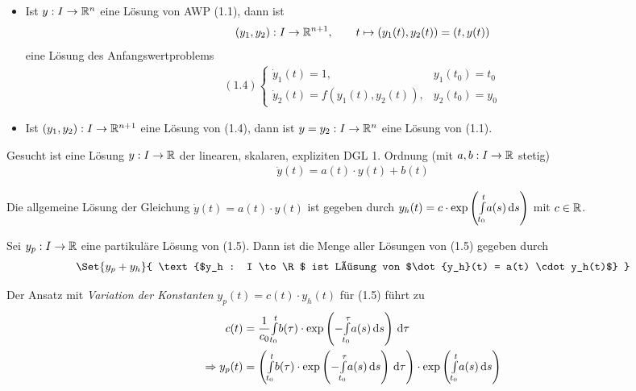 \documentclass{cheat-sheet}
\begin{document}
\begin{satz}
  \begin{itemize}
    \item Ist $y : I \to \mathbb{R}^n$ eine Lösung von AWP (1.1), dann ist
    \[
      (y_1, y_2) : I \to \mathbb{R}^{n+1},\qquad
      t \mapsto (y_1(t), y_2(t)) = (t, y(t))
    \]
    eine Lösung des Anfangswertproblems
    \begin{align*}
      (1.4) \left\{ \begin{array}{ll}
        \dot{y}_1(t) = 1, & y_1(t_0) = t_0\\
        \dot{y}_2(t) = f(y_1(t), y_2(t)), & y_2(t_0) = y_0
      \end{array} \right.
    \end{align*}
    \item Ist $(y_1, y_2) : I \to \mathbb{R}^{n+1}$ eine Lösung von (1.4), dann ist $y = y_2 : I \to \mathbb{R}^n$ eine Lösung von (1.1).
  \end{itemize}
\end{satz}



\begin{prob}
  Gesucht ist eine Lösung $y : I \to \mathbb{R}$ der linearen, skalaren, expliziten DGL 1. Ordnung (mit $a, b : I \to \mathbb{R}$ stetig)
  \begin{align*}
    \dot{y}(t) = a(t) \cdot y(t) + b(t) \tag{1.5}
  \end{align*}
\end{prob}

\begin{satz}
  Die allgemeine Lösung der Gleichung $\dot{y}(t) = a(t) \cdot y(t)$ ist gegeben durch $y_h(t) = c \cdot \exp\left({\textstyle \int\limits_{t_0}^{t}} a(s) \,\mathrm{d} s\right)$ mit $c \in \mathbb{R}$.
\end{satz}

\begin{satz}
  Sei $y_p : I \to \mathbb{R}$ eine partikuläre Lösung von (1.5). Dann ist die Menge aller Lösungen von (1.5) gegeben durch
  \[ \Set{ y_p + y_h }{ \text{$y_h : I \to \R$ ist Lösung von $\dot{y_h}(t) = a(t) \cdot y_h(t)$} } \]
\end{satz}

\begin{bem}
  Der Ansatz mit \emph{Variation der Konstanten} $y_p(t) = c(t) \cdot y_h(t)$ für (1.5) führt zu
  \begin{align*}
    c(t) &= \frac{1}{c_0} {\textstyle \int\limits_{t_0}^{t}} b(\tau) \cdot \exp\left( - {\textstyle \int\limits_{t_0}^{\tau}} a(s) \,\mathrm{d} s \right) \,\mathrm{d} \tau\\
    \Rightarrow y_p(t) &= \left( {\textstyle \int\limits_{t_0}^{t}} b(\tau) \cdot \exp\left( - {\textstyle \int\limits_{t_0}^{\tau}} a(s) \,\mathrm{d} s \right) \,\mathrm{d} \tau \right) \cdot \exp\left( {\textstyle \int\limits_{t_0}^{t}} a(s) \,\mathrm{d} s \right)
  \end{align*}
\end{bem}
\end{document}
